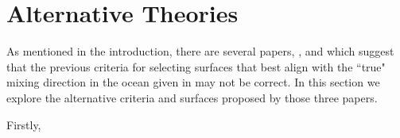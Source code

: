 \section{Alternative Theories}
\label{section:lit_review_alternative_theories}

As mentioned in the introduction, there are several papers, \citet{Tailleux2016}, \citet{Nycander2011} and \citet{STANLEY2019} which suggest that the previous criteria for selecting surfaces  that best align with the ``true" mixing direction in the ocean given in \citet{McDougall1987} may not be correct. In this section we explore the alternative criteria and surfaces proposed by those three papers.

Firstly, 